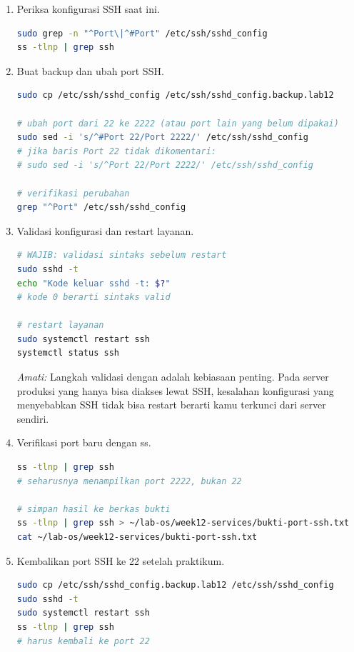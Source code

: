 \begin{enumerate}
    \item Periksa konfigurasi SSH saat ini.
\begin{lstlisting}[language=bash, caption={Periksa konfigurasi SSH awal}]
sudo grep -n "^Port\|^#Port" /etc/ssh/sshd_config
ss -tlnp | grep ssh
\end{lstlisting}

    \item Buat backup dan ubah port SSH.
\begin{lstlisting}[language=bash, caption={Backup dan ubah port SSH}]
sudo cp /etc/ssh/sshd_config /etc/ssh/sshd_config.backup.lab12

# ubah port dari 22 ke 2222 (atau port lain yang belum dipakai)
sudo sed -i 's/^#Port 22/Port 2222/' /etc/ssh/sshd_config
# jika baris Port 22 tidak dikomentari:
# sudo sed -i 's/^Port 22/Port 2222/' /etc/ssh/sshd_config

# verifikasi perubahan
grep "^Port" /etc/ssh/sshd_config
\end{lstlisting}

    \item Validasi konfigurasi dan restart layanan.
\begin{lstlisting}[language=bash, caption={Validasi dan restart SSH}]
# WAJIB: validasi sintaks sebelum restart
sudo sshd -t
echo "Kode keluar sshd -t: $?"
# kode 0 berarti sintaks valid

# restart layanan
sudo systemctl restart ssh
systemctl status ssh
\end{lstlisting}

    \textit{Amati:} Langkah validasi dengan  adalah kebiasaan penting. Pada server produksi yang hanya bisa diakses lewat SSH, kesalahan konfigurasi yang menyebabkan SSH tidak bisa restart berarti kamu terkunci dari server sendiri.

    \item Verifikasi port baru dengan ss.
\begin{lstlisting}[language=bash, caption={Verifikasi port SSH baru}]
ss -tlnp | grep ssh
# seharusnya menampilkan port 2222, bukan 22

# simpan hasil ke berkas bukti
ss -tlnp | grep ssh > ~/lab-os/week12-services/bukti-port-ssh.txt
cat ~/lab-os/week12-services/bukti-port-ssh.txt
\end{lstlisting}

    \item Kembalikan port SSH ke 22 setelah praktikum.
\begin{lstlisting}[language=bash, caption={Kembalikan konfigurasi SSH ke port 22}]
sudo cp /etc/ssh/sshd_config.backup.lab12 /etc/ssh/sshd_config
sudo sshd -t
sudo systemctl restart ssh
ss -tlnp | grep ssh
# harus kembali ke port 22
\end{lstlisting}
\end{enumerate}

